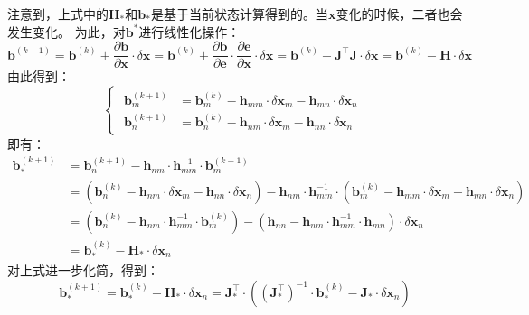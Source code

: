 \documentclass[12pt, onecolumn]{article}
\begin{document}
		注意到，上式中的$\boldsymbol{H}_*$和$\boldsymbol{b}_*$是基于当前状态计算得到的。当$\boldsymbol{x}$变化的时候，二者也会发生变化。
		为此，对$\boldsymbol{b}^*$进行线性化操作：
		\begin{equation}
		\boldsymbol{b}^{(k+1)}=\boldsymbol{b}^{(k)}+\frac{\partial \boldsymbol{b}}{\partial\boldsymbol{x}}\cdot\delta\boldsymbol{x}=
		\boldsymbol{b}^{(k)}+\frac{\partial \boldsymbol{b}}{\partial\boldsymbol{e}}\cdot\frac{\partial \boldsymbol{e}}{\partial\boldsymbol{x}}\cdot\delta\boldsymbol{x}=
		\boldsymbol{b}^{(k)}-\boldsymbol{J}^\top\boldsymbol{J}\cdot\delta\boldsymbol{x}=\boldsymbol{b}^{(k)}-\boldsymbol{H}\cdot\delta\boldsymbol{x}
		\end{equation}
		由此得到：
		\begin{equation}
		\begin{cases}
		\begin{aligned}
		\boldsymbol{b}_m^{(k+1)}&=\boldsymbol{b}_m^{(k)}-\boldsymbol{h}_{mm}\cdot\delta\boldsymbol{x}_m-\boldsymbol{h}_{mn}\cdot\delta\boldsymbol{x}_n
		\\
		\boldsymbol{b}_n^{(k+1)}&=\boldsymbol{b}_n^{(k)}-\boldsymbol{h}_{nm}\cdot\delta\boldsymbol{x}_m-\boldsymbol{h}_{nn}\cdot\delta\boldsymbol{x}_n
		\end{aligned}
		\end{cases}
		\end{equation}
		即有：
		\begin{equation}
		\begin{aligned}
		\boldsymbol{b}^{(k+1)}_*&=\boldsymbol{b}_n^{(k+1)}-\boldsymbol{h}_{nm}\cdot\boldsymbol{h}_{mm}^{-1}\cdot\boldsymbol{b}_{m}^{(k+1)}
		\\
		&=\left( \boldsymbol{b}_n^{(k)}-\boldsymbol{h}_{nm}\cdot\delta\boldsymbol{x}_m-\boldsymbol{h}_{nn}\cdot\delta\boldsymbol{x}_n\right) -\boldsymbol{h}_{nm}\cdot\boldsymbol{h}_{mm}^{-1}\cdot\left(
		\boldsymbol{b}_m^{(k)}-\boldsymbol{h}_{mm}\cdot\delta\boldsymbol{x}_m-\boldsymbol{h}_{mn}\cdot\delta\boldsymbol{x}_n
		\right) 
		\\
		&=\left( \boldsymbol{b}_n^{(k)}-\boldsymbol{h}_{nm}\cdot\boldsymbol{h}_{mm}^{-1}\cdot\boldsymbol{b}_m^{(k)}\right) -\left( \boldsymbol{h}_{nn}-\boldsymbol{h}_{nm}\cdot\boldsymbol{h}_{mm}^{-1}\cdot\boldsymbol{h}_{mn}\right) \cdot\delta\boldsymbol{x}_n
		\\
		&=\boldsymbol{b}_*^{(k)}-\boldsymbol{H}_*\cdot\delta\boldsymbol{x}_n
		\end{aligned}
		\end{equation}
		对上式进一步化简，得到：
		\begin{equation}
		\boldsymbol{b}^{(k+1)}_*=\boldsymbol{b}_*^{(k)}-\boldsymbol{H}_*\cdot\delta\boldsymbol{x}_n=\boldsymbol{J}_*^\top\cdot\left(\left( {\boldsymbol{J}_*^\top}\right) ^{-1}\cdot\boldsymbol{b}_*^{(k)} -\boldsymbol{J}_*\cdot\delta\boldsymbol{x}_n\right) 
		\end{equation}
\end{document}
